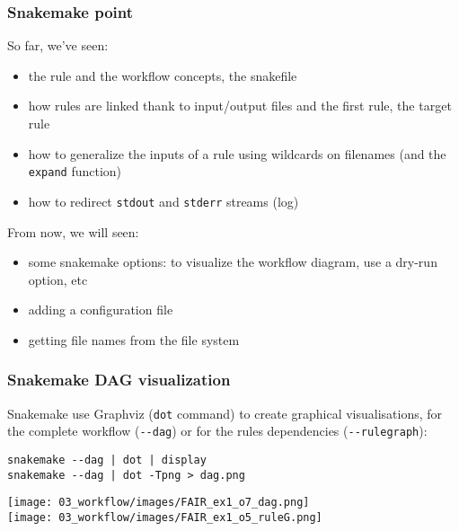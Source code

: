 \begin{frame}[containsverbatim]
\frametitle{Snakemake point}
\begin{block}{So far, we've seen:}
\begin{itemize}
    \item the rule and the workflow concepts, the snakefile
    \item how rules are linked thank to input/output files and the first rule, the target rule
    \item how to generalize the inputs of a rule using wildcards on filenames (and the \verb|expand| function)
    \item how to redirect \verb|stdout| and \verb|stderr| streams (log)
\end{itemize}
\end{block}
\begin{block}{From now, we will seen:}
\begin{itemize}
    \item some snakemake options: to visualize the workflow diagram, use a dry-run option, etc
    \item adding a configuration file
    \item getting file names from the file system
\end{itemize}
\end{block}
\end{frame}
\begin{frame}[containsverbatim]
\frametitle{Snakemake DAG visualization}
\begin{block}{}
Snakemake use Graphviz (\verb|dot| command) to create graphical visualisations, for the complete workflow (\verb|--dag|) or for the rules dependencies (\verb|--rulegraph|):
\begin{lstlisting}
snakemake --dag | dot | display
snakemake --dag | dot -Tpng > dag.png
\end{lstlisting}
\end{block}
\begin{center}
    \texttt{[image: 03\_workflow/images/FAIR\_ex1\_o7\_dag.png]}\\
    \texttt{[image: 03\_workflow/images/FAIR\_ex1\_o5\_ruleG.png]}
\end{center}
\end{frame}
